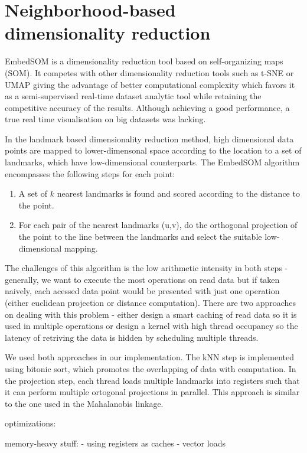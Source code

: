 \section{Neighborhood-based dimensionality reduction}

EmbedSOM is a dimensionality reduction tool based on self-organizing maps (SOM). It competes with other dimensionality reduction tools such as t-SNE or UMAP giving the advantage of better computational complexity which favors it as a semi-supervised real-time dataset analytic tool while retaining the competitive accuracy of the results.
Although achieving a good performance, a true real time visualisation on big datasets was lacking. 

In the landmark based dimensionality reduction method, high dimensional data points are mapped to lower-dimensonal space according to the location to a set of landmarks, which have low-dimensional counterparts.
The EmbedSOM algorithm encompasses the following steps for each point:
\begin{enumerate}
    \item A set of $k$ nearest landmarks is found and scored according to the distance to the point.
    \item For each pair of the nearest landmarks (u,v), do the orthogonal projection of the point to the line between the landmarks and select the suitable low-dimensional mapping.
\end{enumerate}

The challenges of this algorithm is the low arithmetic intensity in both steps - generally, we want to execute the most operations on read data but if taken naively, each acessed data point would be presented with just one operation (either euclidean projection or distance computation).
There are two approaches on dealing with this problem - either design a smart caching of read data so it is used in multiple operations or design a kernel with high thread occupancy so the latency of retriving the data is hidden by scheduling multiple threads.

We used both approaches in our implementation. The kNN step is implemented using bitonic sort, which promotes the overlapping of data with computation. In the projection step, each thread loads multiple landmarks into registers such that it can perform multiple ortogonal projections in parallel. This approach is similar to the one used in the Mahalanobis linkage.

optimizations:

memory-heavy stuff:
- using registers as caches
- vector loads

